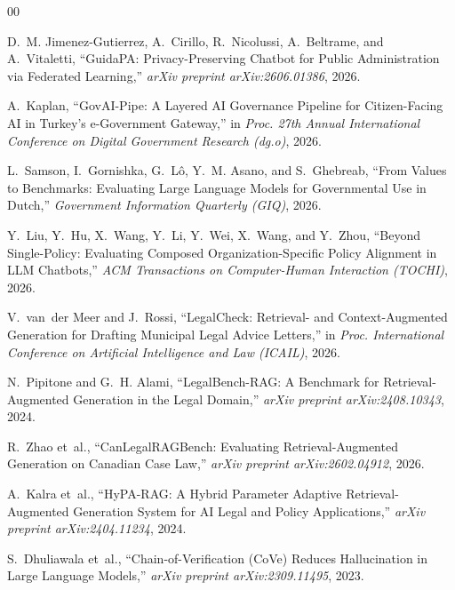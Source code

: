\documentclass[11pt,a4paper]{article}
\begin{document}
\begin{thebibliography}{00}

D.~M. Jimenez-Gutierrez, A.~Cirillo, R.~Nicolussi, A.~Beltrame, and A.~Vitaletti,
``GuidaPA: Privacy-Preserving Chatbot for Public Administration via Federated Learning,''
\emph{arXiv preprint arXiv:2606.01386}, 2026.

A.~Kaplan,
``GovAI-Pipe: A Layered AI Governance Pipeline for Citizen-Facing AI in Turkey's e-Government Gateway,''
in \emph{Proc. 27th Annual International Conference on Digital Government Research (dg.o)}, 2026.

L.~Samson, I.~Gornishka, G.~L\^o, Y.~M. Asano, and S.~Ghebreab,
``From Values to Benchmarks: Evaluating Large Language Models for Governmental Use in Dutch,''
\emph{Government Information Quarterly (GIQ)}, 2026.

Y.~Liu, Y.~Hu, X.~Wang, Y.~Li, Y.~Wei, X.~Wang, and Y.~Zhou,
``Beyond Single-Policy: Evaluating Composed Organization-Specific Policy Alignment in LLM Chatbots,''
\emph{ACM Transactions on Computer-Human Interaction (TOCHI)}, 2026.

V.~van~der Meer and J.~Rossi,
``LegalCheck: Retrieval- and Context-Augmented Generation for Drafting Municipal Legal Advice Letters,''
in \emph{Proc. International Conference on Artificial Intelligence and Law (ICAIL)}, 2026.

N.~Pipitone and G.~H. Alami,
``LegalBench-RAG: A Benchmark for Retrieval-Augmented Generation in the Legal Domain,''
\emph{arXiv preprint arXiv:2408.10343}, 2024.

R.~Zhao et~al.,
``CanLegalRAGBench: Evaluating Retrieval-Augmented Generation on Canadian Case Law,''
\emph{arXiv preprint arXiv:2602.04912}, 2026.

A.~Kalra et~al.,
``HyPA-RAG: A Hybrid Parameter Adaptive Retrieval-Augmented Generation System for AI Legal and Policy Applications,''
\emph{arXiv preprint arXiv:2404.11234}, 2024.

S.~Dhuliawala et~al.,
``Chain-of-Verification (CoVe) Reduces Hallucination in Large Language Models,''
\emph{arXiv preprint arXiv:2309.11495}, 2023.


\end{thebibliography}
\end{document}
